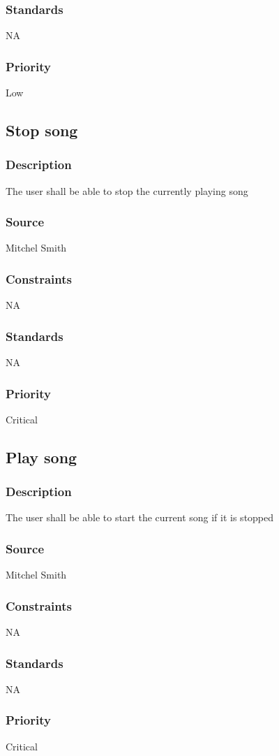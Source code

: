 \subsubsection{Standards}
NA
\subsubsection{Priority}
Low


\subsection{Stop song}
\subsubsection{Description}
The user shall be able to stop the currently playing song
\subsubsection{Source}
Mitchel Smith
\subsubsection{Constraints}
NA
\subsubsection{Standards}
NA
\subsubsection{Priority}
Critical


\subsection{Play song}
\subsubsection{Description}
The user shall be able to start the current song if it is stopped
\subsubsection{Source}
Mitchel Smith
\subsubsection{Constraints}
NA
\subsubsection{Standards}
NA
\subsubsection{Priority}
Critical

